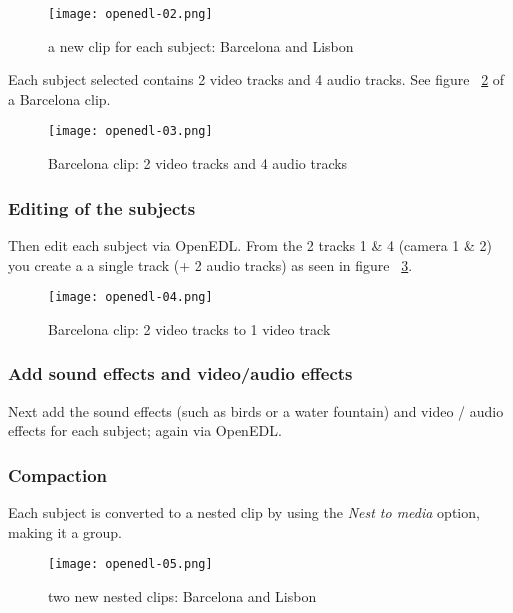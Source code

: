 \begin{figure}[htpb]
	\centering
	\texttt{[image: openedl-02.png]}
	\caption{a new clip for each subject: Barcelona and Lisbon}
	\label{fig:openedl-02}
\end{figure}

Each subject selected contains 2 video tracks and 4 audio tracks. See figure ~\ref{fig:openedl-03} of a Barcelona clip.

\begin{figure}[htpb]
	\centering
	\texttt{[image: openedl-03.png]}
	\caption{Barcelona clip: 2 video tracks and 4 audio tracks}
	\label{fig:openedl-03}
\end{figure}

\subsubsection*{Editing of the subjects}
\label{ssub:editing_subjects}

Then edit each subject via OpenEDL. From the 2 tracks 1 \& 4 (camera 1 \& 2) you create a a single track (+ 2 audio tracks) as seen in figure ~\ref{fig:openedl-04}.

\begin{figure}[htpb]
	\centering
	\texttt{[image: openedl-04.png]}
	\caption{Barcelona clip: 2 video tracks to 1 video track}
	\label{fig:openedl-04}
\end{figure}

\subsubsection*{Add sound effects and video/audio effects}
\label{ssub:add_sound_video_effects}

Next add the sound effects (such as birds or a water fountain) and video / audio effects for each subject; again via OpenEDL.

\subsubsection*{Compaction}
\label{ssub:compaction}

Each subject is converted to a nested clip by using the \textit{Nest to media} option, making it a group.

\begin{figure}[htpb]
	\centering
	\texttt{[image: openedl-05.png]}
	\caption{two new nested clips: Barcelona and Lisbon}
	\label{fig:openedl-05}
\end{figure}

